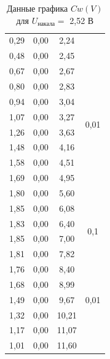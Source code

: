 \documentclass[a4paper,12pt]{report}
\begin{document}
\begin{table}[H]
\begin{tabular}{|c|c|c|c|}
0,29 & 0,00    & 2,24  & \multirow{12}{*}{0,01} \\ \cline{1-3}
0,48 & 0,00    & 2,45  &                        \\ \cline{1-3}
0,67 & 0,00    & 2,67  &                        \\ \cline{1-3}
0,80 & 0,00    & 2,83  &                        \\ \cline{1-3}
0,94 & 0,00    & 3,04  &                        \\ \cline{1-3}
1,07 & 0,00    & 3,27  &                        \\ \cline{1-3}
1,26 & 0,00    & 3,63  &                        \\ \cline{1-3}
1,48 & 0,00    & 4,16  &                        \\ \cline{1-3}
1,58 & 0,00    & 4,51  &                        \\ \cline{1-3}
1,69 & 0,00    & 4,95  &                        \\ \cline{1-3}
1,80 & 0,00    & 5,60  &                        \\ \cline{1-3}
1,85 & 0,00    & 6,08  &                        \\ \hline
1,83 & 0,00    & 6,40  & \multirow{2}{*}{0,1}   \\ \cline{1-3}
1,85 & 0,00    & 7,00  &                        \\ \hline
1,81 & 0,00    & 7,82  & \multirow{7}{*}{0,01}  \\ \cline{1-3}
1,76 & 0,00    & 8,40  &                        \\ \cline{1-3}
1,68 & 0,00    & 8,99  &                        \\ \cline{1-3}
1,49 & 0,00    & 9,67  &                        \\ \cline{1-3}
1,32 & 0,00    & 10,21 &                        \\ \cline{1-3}
1,17 & 0,00    & 11,07 &                        \\ \cline{1-3}
1,01 & 0,00    & 11,60 &                        \\ \hline
\end{tabular}
\caption{Данные графика $Cw(V)$ для $U_{\text{накала}}=$ 2,52 В}
\end{table}
\end{document}
